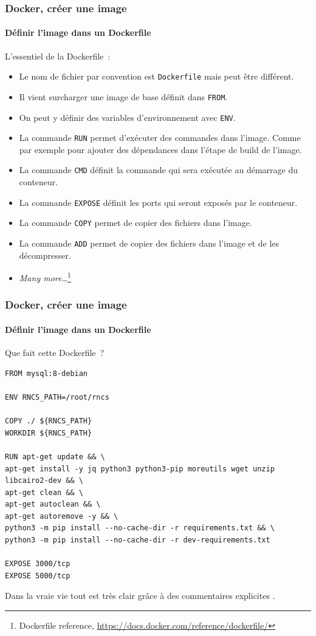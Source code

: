 \documentclass{beamer}
\begin{document}
    \begin{frame}
        \transdissolve
        \frametitle{Docker, créer une image}
        \framesubtitle{Définir l'image dans un Dockerfile}
        L'essentiel de la Dockerfile~:
        \begin{itemize}
            \item Le nom de fichier par convention est \lstinline{Dockerfile} mais peut être différent.
            \item Il vient surcharger une image de base définit dans \lstinline{FROM}.
            \item On peut y définir des variables d'environnement avec \lstinline{ENV}.
            \item La commande \lstinline{RUN} permet d'exécuter des commandes dans l'image.
            Comme par exemple pour ajouter des dépendances dans l'étape de build de l'image.
            \item La commande \lstinline{CMD} définit la commande qui sera exécutée au démarrage du conteneur.
            \item La commande \lstinline{EXPOSE} définit les ports qui seront exposés par le conteneur.
            \item La commande \lstinline{COPY} permet de copier des fichiers dans l'image.
            \item La commande \lstinline{ADD} permet de copier des fichiers dans l'image et de les décompresser.
            \item \textit{Many more\ldots}\footnote{Dockerfile reference, \url{https://docs.docker.com/reference/dockerfile/}}
        \end{itemize}
    \end{frame}

    \begin{frame}[fragile]
        \transdissolve
        \frametitle{Docker, créer une image}
        \framesubtitle{Définir l'image dans un Dockerfile}
        Que fait cette Dockerfile~?
        \begin{lstlisting}[basicstyle=\ttfamily\tiny]
FROM mysql:8-debian

ENV RNCS_PATH=/root/rncs

COPY ./ ${RNCS_PATH}
WORKDIR ${RNCS_PATH}

RUN apt-get update && \
apt-get install -y jq python3 python3-pip moreutils wget unzip libcairo2-dev && \
apt-get clean && \
apt-get autoclean && \
apt-get autoremove -y && \
python3 -m pip install --no-cache-dir -r requirements.txt && \
python3 -m pip install --no-cache-dir -r dev-requirements.txt

EXPOSE 3000/tcp
EXPOSE 5000/tcp
        \end{lstlisting}
        Dans la vraie vie tout est très clair grâce à des commentaires explicites .
    \end{frame}
\end{document}
